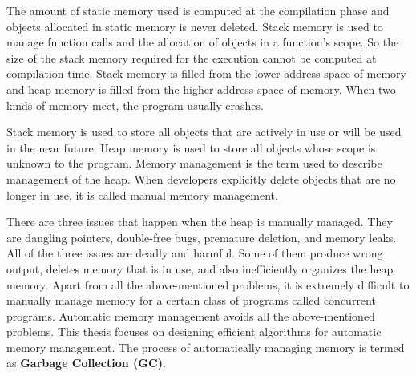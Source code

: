 The amount of static memory used is computed at the compilation phase and objects allocated in static memory is never deleted. Stack memory is used to manage function calls and the allocation of objects in a function's scope. So the size of the stack memory required for the execution cannot be computed at compilation time. Stack memory is filled from the lower address space of memory and heap memory is filled from the higher address space of memory. When two kinds of memory meet, the program usually crashes. 

Stack memory is used to store all objects that are actively in use or will be used in the near future. Heap memory is used to store all objects whose scope is unknown to the program. Memory management is the term used to describe management of the heap. When developers explicitly delete objects that are no longer in use, it is called manual memory management. 

There are three issues that happen when the heap is manually managed. They are dangling pointers, double-free bugs, premature deletion, and memory leaks. All of the three issues are deadly and harmful. Some of them produce wrong output, deletes memory that is in use, and also inefficiently organizes the heap memory.  Apart from all the above-mentioned problems, it is extremely difficult to manually manage memory for a certain class of programs called concurrent programs. Automatic memory
management avoids all the above-mentioned problems.
This thesis focuses on designing efficient algorithms for automatic memory management. The process of automatically managing memory is termed as \textbf{Garbage Collection (GC)}.
\begin{comment}
Heap memory helps a developer to extend the life of dynamically allocated objects. Some object allocated in the heap might get a very long life as long as the life of the program running. So these objects have an infinite life if the programmer did not delete them after their last use. The unwanted objects in the heap occupy the heap memory and might make an application run out of memory and exit. In order to avoid pseudo full heap memory errors, programmers determine the life of the dynamically allocated objects and delete them. The dynamically allocated objects can be accessed only by pointers in the static and stack memory. These pointers are also called as \textbf{roots}.
\end{comment}
